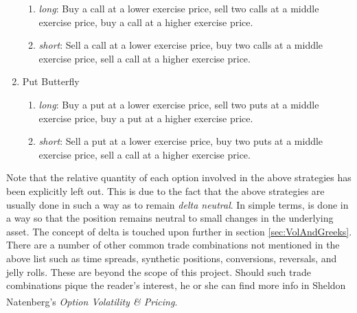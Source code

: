 \documentclass[12pt, a4paper, notitlepage]{article}
\numberwithin{equation}{subsection}
\numberwithin{figure}{subsection}
\numberwithin{table}{subsection}
\newcommand{\newpar}{\newline \newline}
\begin{document}
\begin{enumerate}
\begin{enumerate}
    		\item \textit{long}:  Buy a call at a lower exercise price, sell two calls at a middle exercise price, buy a call at a higher exercise price.
            \item \textit{short}:  Sell a call at a lower exercise price, buy two calls at a middle exercise price, sell a call at a higher exercise price.
    	\end{enumerate}
    \item Put Butterfly
    	\begin{enumerate}
    		\item \textit{long}:  Buy a put at a lower exercise price, sell two puts at a middle exercise price, buy a put at a higher exercise price.
            \item \textit{short}:  Sell a put at a lower exercise price, buy two puts at a middle exercise price, sell a call at a higher exercise price.
    	\end{enumerate}
\end{enumerate}
Note that the relative quantity of each option involved in the above strategies has been explicitly left out.  This is due to the fact that the above strategies are usually done in such a way as to remain \textit{delta neutral}.  In simple terms, is done in a way so that the position remains neutral to small changes in the underlying asset.  The concept of delta is touched upon further in section \ref{sec:VolAndGreeks}.
\newpar
There are a number of other common trade combinations not mentioned in the above list such as time spreads, synthetic positions, conversions, reversals, and jelly rolls.  These are beyond the scope of this project.  Should such trade combinations pique the reader's interest, he or she can find more info in Sheldon Natenberg's \textit{Option Volatility \& Pricing}\textsuperscript{\cite{Natenberg}}.
\end{document}
